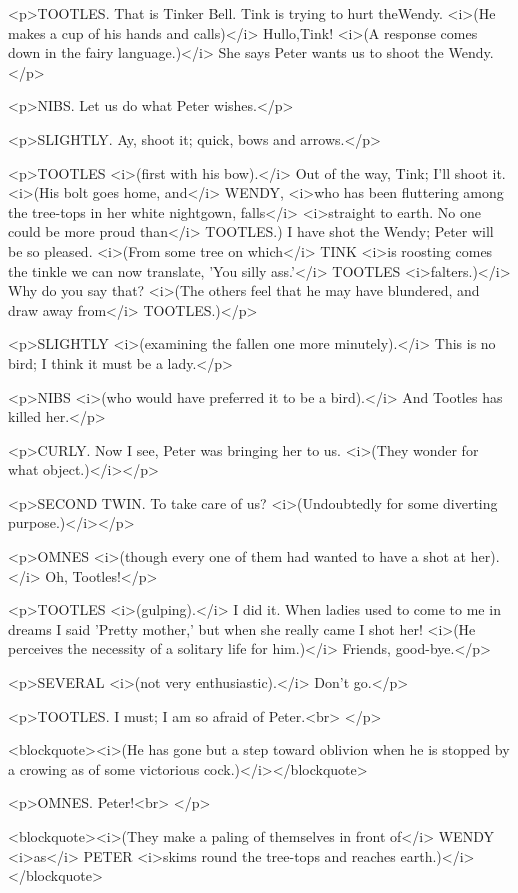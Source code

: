 <p>TOOTLES. That is Tinker Bell. Tink is trying to hurt theWendy.
<i>(He makes a cup of his hands and calls)</i> Hullo,Tink! <i>(A
response comes down in the fairy language.)</i> She says Peter wants
us to shoot the Wendy.</p>

<p>NIBS. Let us do what Peter wishes.</p>

<p>SLIGHTLY. Ay, shoot it; quick, bows and arrows.</p>

<p>TOOTLES <i>(first with his bow).</i> Out of the way, Tink; I'll
shoot it. <i>(His bolt goes home, and</i> WENDY, <i>who has been
fluttering among the tree-tops in her white nightgown, falls</i>
<i>straight to earth. No one could be more proud than</i> TOOTLES.) I
have shot the Wendy; Peter will be so pleased. <i>(From some tree on
which</i> TINK <i>is roosting comes the tinkle we can now translate,
'You silly ass.'</i> TOOTLES <i>falters.)</i> Why do you say that?
<i>(The others feel that he may have blundered, and draw away
from</i> TOOTLES.)</p>

<p>SLIGHTLY <i>(examining the fallen one more minutely).</i> This is
no bird; I think it must be a lady.</p>

<p>NIBS <i>(who would have preferred it to be a bird).</i> And
Tootles has killed her.</p>

<p>CURLY. Now I see, Peter was bringing her to us. <i>(They wonder
for what object.)</i></p>

<p>SECOND TWIN. To take care of us? <i>(Undoubtedly for some
diverting purpose.)</i></p>

<p>OMNES <i>(though every one of them had wanted to have a shot at
her).</i> Oh, Tootles!</p>

<p>TOOTLES <i>(gulping).</i> I did it. When ladies used to come to me
in dreams I said 'Pretty mother,' but when she really came I shot
her! <i>(He perceives the necessity of a solitary life for him.)</i>
Friends, good-bye.</p>

<p>SEVERAL <i>(not very enthusiastic).</i> Don't go.</p>

<p>TOOTLES. I must; I am so afraid of Peter.<br>
</p>

<blockquote><i>(He has gone but a step toward oblivion when he is
stopped by a crowing as of some victorious cock.)</i></blockquote>

<p>OMNES. Peter!<br>
</p>

<blockquote><i>(They make a paling of themselves in front of</i>
WENDY <i>as</i> PETER <i>skims round the tree-tops and reaches
earth.)</i></blockquote>

